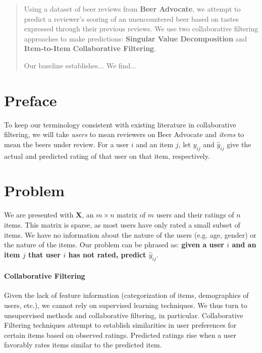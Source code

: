 \documentclass[12pt]{article}
\begin{document}
\maketitle
\begin{abstract}
Using a dataset of beer reviews from \textbf{Beer Advocate}, we attempt to predict a reviewer's scoring of an unencountered beer based on tastes expressed through their previous reviews. We use two collaborative filtering approaches to make predictions: \textbf{Singular Value Decomposition} and \textbf{Item-to-Item Collaborative Filtering}.

Our baseline establishes...
We find...

\end{abstract}



\section{Preface}
To keep our terminology consistent with existing literature in collaborative filtering, we will take \textit{users} to mean reviewers on Beer Advocate and \textit{items} to mean the beers under review. For a user $i$ and an item $j$, let $y_{ij}$ and $\hat y_{ij}$ give the actual and predicted rating of that user on that item, respectively.

\section{Problem}
We are presented with $\mathbf{X}$, an $m \times n$ matrix of $m$ users and their ratings of $n$ items. This matrix is sparse, as most users have only rated a small subset of items. We have no information about the nature of the users (e.g. age, gender) or the nature of the items. Our problem can be phrased as: \textbf{given a user $i$ and an item $j$ that user $i$ has not rated, predict $\hat y_{ij}$}.

\paragraph{Collaborative Filtering} Given the lack of feature information (categorization of items, demographics of users, etc.), we cannot rely on supervised learning techniques. We thus turn to unsupervised methods and collaborative filtering, in particular. Collaborative Filtering techniques attempt to establish similarities in user preferences for certain items based on observed ratings. Predicted ratings rise when a user favorably rates items similar to the predicted item.
\end{document}
